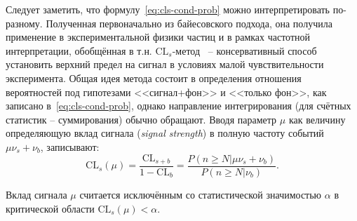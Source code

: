 Следует заметить, что формулу~\eqref{eq:cls-cond-prob} можно
интерпретировать по-разному. Полученная первоначально из
байесовского подхода, она получила применение в
экспериментальной физики частиц и в рамках частотной
интерпретации, обобщённая в
т.н. $\text{CL}_s$-метод~\cite{cls-harel, read-cls} -- консервативный
способ установить верхний предел на сигнал в условиях малой
чувствительности эксперимента. Общая идея метода состоит в
определения отношения вероятностей под гипотезами <<сигнал+фон>>
и <<только фон>>, как записано в~\eqref{eq:cls-cond-prob},
однако направление интегрирования (для счётных статистик -- суммирования)
обычно обращают. Вводя параметр $\mu$ как величину определяющую вклад сигнала
(\emph{signal strength}) в полную частоту
событий $\mu \nu_s + \nu_b$, записывают:
\begin{equation}
    \text{CL}_s (\mu) = \frac{\text{CL}_{s+b}}{1 - \text{CL}_b} = \frac{P(n \ge N | \mu\nu_s + \nu_b)}{P(n \ge N | \nu_b)}.
    \label{eq:cls-definition}
\end{equation}


Вклад сигнала $\mu$ считается исключённым со статистической
значимостью $\alpha$ в критической области $\text{CL}_s(\mu) < \alpha$.




